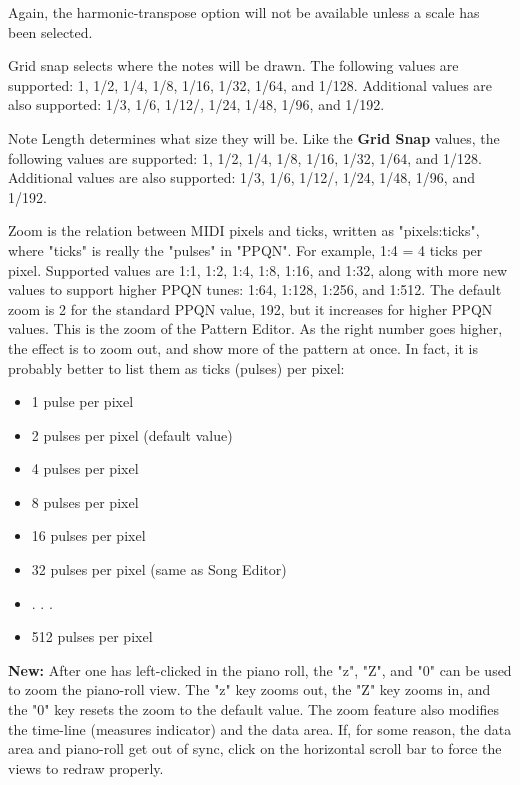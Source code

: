    Again, the harmonic-transpose option will not be available unless a scale
   has been selected.

   Grid snap selects where the notes will be drawn.
   The following values are supported:
   1, 1/2, 1/4, 1/8, 1/16, 1/32, 1/64, and 1/128.
   Additional values are also supported:
   1/3, 1/6, 1/12/, 1/24, 1/48, 1/96, and 1/192.

   Note Length determines what size they will be.
   Like the \textbf{Grid Snap} values,
   the following values are supported:
   1, 1/2, 1/4, 1/8, 1/16, 1/32, 1/64, and 1/128.
   Additional values are also supported:
   1/3, 1/6, 1/12/, 1/24, 1/48, 1/96, and 1/192.

   Zoom is the relation between MIDI pixels and ticks, written as
   "pixels:ticks", where "ticks" is really the "pulses" in "PPQN".
   For example, 1:4 = 4 ticks per pixel.
   Supported values are 1:1, 1:2, 1:4, 1:8, 1:16, and 1:32, along with
   more new values to support higher PPQN tunes: 1:64, 1:128, 1:256, and
   1:512.
   The default zoom is 2 for the standard PPQN value, 192, but it
   increases for higher PPQN values.
   This is the zoom of the Pattern Editor.  As the right number goes higher,
   the effect is to zoom out, and show more of the pattern at once.
   In fact, it is probably better to list them as ticks (pulses) per pixel:

   \begin{itemize}
      \item 1 pulse per pixel
      \item 2 pulses per pixel (default value)
      \item 4 pulses per pixel
      \item 8 pulses per pixel
      \item 16 pulses per pixel
      \item 32 pulses per pixel (same as Song Editor)
      \item . . .
      \item 512 pulses per pixel
   \end{itemize}

   \textbf{New:}
   After one has left-clicked in the piano roll, the "z", "Z", and "0"
   can be used to zoom the piano-roll view.  The "z" key zooms out, the "Z" key
   zooms in, and the "0" key resets the zoom to the default value.
   The zoom feature also modifies the time-line (measures indicator) and
   the data area.
   If, for some reason, the data area and piano-roll get out of sync, click on
   the horizontal scroll bar to force the views to redraw properly.

